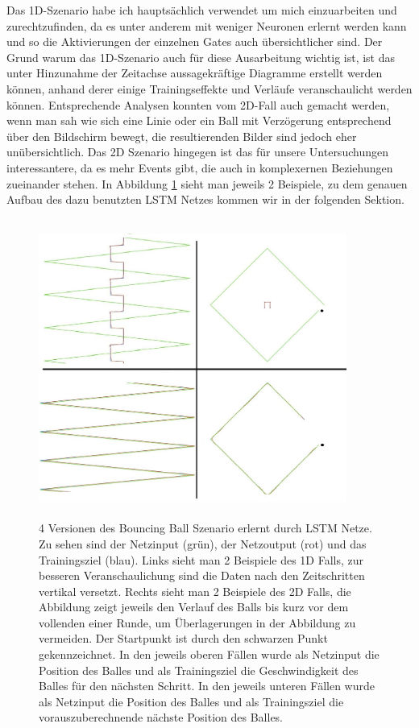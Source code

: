 Das 1D-Szenario habe ich hauptsächlich verwendet um mich einzuarbeiten und zurechtzufinden, da es unter anderem mit weniger Neuronen erlernt werden kann und so die Aktivierungen der einzelnen Gates auch übersichtlicher sind. Der Grund warum das 1D-Szenario auch für diese Ausarbeitung wichtig ist, ist das unter Hinzunahme der Zeitachse aussagekräftige Diagramme erstellt werden können, anhand derer einige Trainingseffekte und Verläufe veranschaulicht werden können. Entsprechende Analysen konnten vom 2D-Fall auch gemacht werden, wenn man sah wie sich eine Linie oder ein Ball mit Verzögerung entsprechend über den Bildschirm bewegt, die resultierenden Bilder sind jedoch eher unübersichtlich. Das 2D Szenario hingegen ist das für unsere Untersuchungen interessantere, da es mehr Events gibt, die auch in komplexernen Beziehungen zueinander stehen. In Abbildung \ref{img:1dvs2d} sieht man jeweils 2 Beispiele, zu dem genauen Aufbau des dazu benutzten LSTM Netzes kommen wir in der folgenden Sektion.
\begin{figure}
	\centering
	\includegraphics[width=0.9\textwidth, height=370px]{pics/1dvs2d.jpg}	
	\caption{4 Versionen des Bouncing Ball Szenario erlernt durch LSTM Netze. Zu sehen sind der Netzinput (grün), der Netzoutput (rot) und das Trainingsziel (blau). Links sieht man 2 Beispiele des 1D Falls, zur besseren Veranschaulichung sind die Daten nach den Zeitschritten vertikal versetzt. Rechts sieht man 2 Beispiele des 2D Falls, die Abbildung zeigt jeweils den Verlauf des Balls bis kurz vor dem vollenden einer Runde, um Überlagerungen in der Abbildung zu vermeiden. Der Startpunkt ist durch den schwarzen Punkt gekennzeichnet. In den jeweils oberen Fällen wurde als Netzinput die Position des Balles und als Trainingsziel die Geschwindigkeit des Balles für den nächsten Schritt. In den jeweils unteren Fällen wurde als Netzinput die Position des Balles und als Trainingsziel die vorauszuberechnende nächste Position des Balles.}
	\label{img:1dvs2d}
\end{figure}

